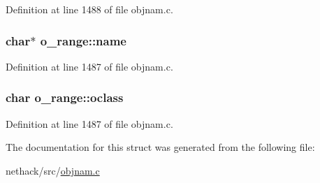 Definition at line 1488 of file objnam.\+c.

\hypertarget{structo__range_ab2341291a89bbb35f012d6124076076c}{
\subsubsection[{name}]{ char$\ast$ o\+\_\+range\+::name}}\label{structo__range_ab2341291a89bbb35f012d6124076076c}


Definition at line 1487 of file objnam.\+c.

\hypertarget{structo__range_a3d1aa524ba694272ae24bd964f1dde2e}{
\subsubsection[{oclass}]{ char o\+\_\+range\+::oclass}}\label{structo__range_a3d1aa524ba694272ae24bd964f1dde2e}


Definition at line 1487 of file objnam.\+c.



The documentation for this struct was generated from the following file\+:\begin{DoxyCompactItemize}
\item 
nethack/src/\hyperlink{objnam_8c}{objnam.\+c}\end{DoxyCompactItemize}
